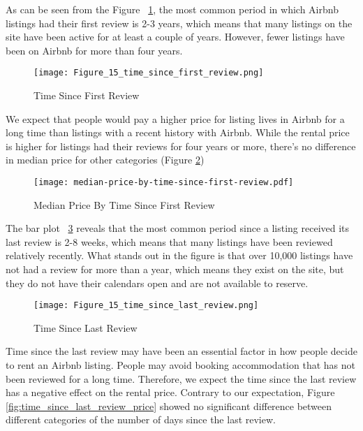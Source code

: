 As can be seen from the Figure ~\ref{fig:time_since_first_review}, the most
common period in which  Airbnb listings had their first review is 2-3 years,
which means that many listings on the site have been active for at least a
couple of years. However,  fewer listings have been on Airbnb for more than four
years.

\begin{figure}[!htbp]\centering
    \texttt{[image: Figure\_15\_time\_since\_first\_review.png]}
    \caption{Time Since First Review}
    \label{fig:time_since_first_review}
\end{figure}

We expect that people would pay a higher price for listing lives in Airbnb for a
long time than listings with a recent history with Airbnb.
While the rental price is higher for listings had their reviews for four years
or more, there's no difference in median price for other categories
(Figure \ref{fig:time_since_first_review_price})

\begin{figure}[!htbp]\centering
    \texttt{[image: median-price-by-time-since-first-review.pdf]}
    \caption{Median Price By Time Since First Review}
    \label{fig:time_since_first_review_price}
\end{figure}

The bar plot ~\ref{fig:time_since_last_review} reveals that the most
common period since a listing received its last review is 2-8 weeks, which means
that many listings have been reviewed relatively recently.  What stands out in
the figure is that over 10,000 listings have not had a review for more than a
year, which means they exist on the site, but they do not have their calendars
open and are not available to reserve.

\begin{figure}[!htbp]\centering
    \texttt{[image: Figure\_15\_time\_since\_last\_review.png]}
    \caption{Time Since Last Review}
    \label{fig:time_since_last_review}
\end{figure}

Time since the last review may have been an essential factor in how people
decide to rent an Airbnb listing. People may avoid booking accommodation that
has not been reviewed for a long time. Therefore, we expect the time since the
last review has a negative effect on the rental price. Contrary to our
expectation, Figure \ref{fig:time_since_last_review_price} showed no significant
difference between different categories of the number of days since the last
review.

